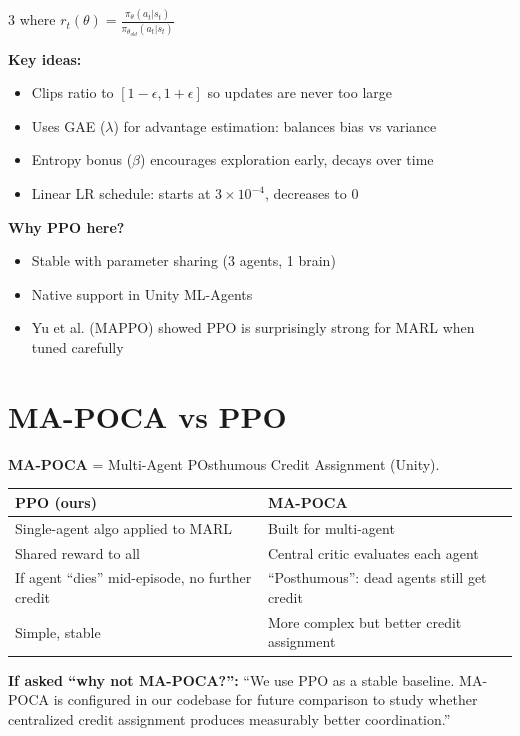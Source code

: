 \documentclass[10pt,landscape,a4paper]{article}
\begin{document}
\begin{multicols}{3}
where $r_t(\theta) = \frac{\pi_\theta(a_t|s_t)}{\pi_{\theta_{old}}(a_t|s_t)}$

\textbf{Key ideas:}
\begin{itemize}
\item Clips ratio to $[1{-}\epsilon, 1{+}\epsilon]$ so updates are never too large
\item Uses GAE ($\lambda$) for advantage estimation: balances bias vs variance
\item Entropy bonus ($\beta$) encourages exploration early, decays over time
\item Linear LR schedule: starts at $3\times10^{-4}$, decreases to 0
\end{itemize}

\textbf{Why PPO here?}
\begin{itemize}
\item Stable with parameter sharing (3 agents, 1 brain)
\item Native support in Unity ML-Agents
\item Yu et al. (MAPPO) showed PPO is surprisingly strong for MARL when tuned carefully
\end{itemize}

\section{MA-POCA vs PPO}

\textbf{MA-POCA} = Multi-Agent POsthumous Credit Assignment (Unity).

\begin{tabular}{@{}p{3.5cm}p{3.5cm}@{}}
\toprule
\textbf{PPO (ours)} & \textbf{MA-POCA} \\
\midrule
Single-agent algo applied to MARL & Built for multi-agent \\
Shared reward to all & Central critic evaluates each agent \\
If agent ``dies'' mid-episode, no further credit & ``Posthumous'': dead agents still get credit \\
Simple, stable & More complex but better credit assignment \\
\bottomrule
\end{tabular}

\textbf{If asked ``why not MA-POCA?'':} ``We use PPO as a stable baseline. MA-POCA is configured in our codebase for future comparison to study whether centralized credit assignment produces measurably better coordination.''


\end{multicols}
\end{document}

